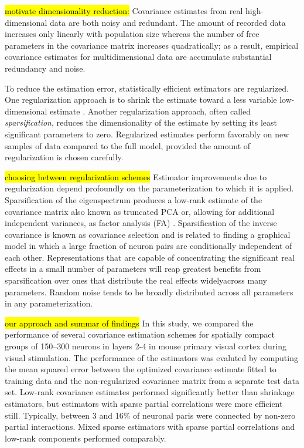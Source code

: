 \hl{\tiny motivate dimensionality reduction:}
 Covariance estimates from real high-dimensional data  are both noisy and redundant.  The amount of recorded data increases only linearly with population size whereas the number of free parameters in the covariance matrix increases quadratically; as a result, empirical covariance estimates for multidimensional data are  accumulate substantial redundancy and noise. 

To reduce the estimation error, statistically efficient estimators are regularized.  One regularization approach is to shrink the estimate toward a less variable low-dimensional estimate \citep{Schafer:2005}.  Another regularization approach, often called \emph{sparsification}, reduces the dimensionality of the estimate by setting its least significant parameters to zero. 
Regularized estimates perform favorably on new samples of data compared to the full model, provided the amount of regularization is chosen carefully.

\hl{\tiny choosing between regularization schemes}
Estimator improvements due to regularization depend profoundly on the parameterization to which it is applied.  Sparsification of the eigenspectrum produces a low-rank estimate of the covariance matrix also known as truncated PCA \citep{Rothman:2008} or, allowing for additional independent variances, as factor analysis (FA) \citep{Fan:2008}.  Sparsification of the inverse covariance is known as covariance selection \citep{Dempster:1972,Friedman:2008} and is related to finding a graphical model in which a large fraction of neuron pairs are conditionally independent of each other.  Representations that are capable of concentrating the significant real effects in a small number of parameters will reap greatest benefits from sparsification over ones that distribute the real effects widelyacross many parameters.  Random noise tends to be broadly distributed across all parameters in any parameterization. 


\hl{\tiny our approach and summar of findings} 
In this study, we compared the performance of several covariance estimation schemes for spatially compact groups of 150--300 neurons in layers 2-4 in mouse primary visual cortex during visual stimulation.   The performance of the estimators was evaluted by computing the mean squared error between the optimized covariance estimate fitted to training data and the non-regularized covariance matrix from a separate test data set.  Low-rank covariance estimates performed significantly better than shrinkage estimators, but estimators with sparse partial correlations were more efficient still. Typically, between 3 and 16\% of neuronal paris were connected by non-zero partial interactions.  Mixed sparse estimators with sparse partial correlations and low-rank components performed comparably. 

